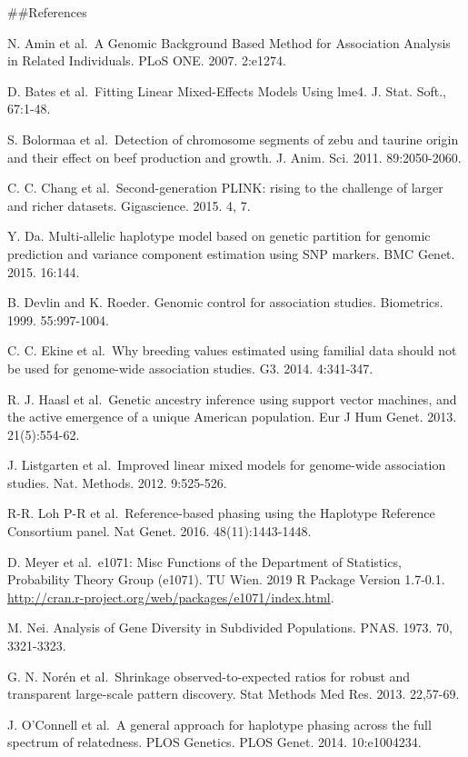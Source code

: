 \documentclass[
]{article}
\begin{document}
\pagebreak

\#\#References

N. Amin et al.~A Genomic Background Based Method for Association
Analysis in Related Individuals. PLoS ONE. 2007. 2:e1274.

D. Bates et al.~Fitting Linear Mixed-Effects Models Using lme4. J. Stat.
Soft., 67:1-48.

S. Bolormaa et al.~Detection of chromosome segments of zebu and taurine
origin and their effect on beef production and growth. J. Anim. Sci.
2011. 89:2050-2060.

C. C. Chang et al.~Second-generation PLINK: rising to the challenge of
larger and richer datasets. Gigascience. 2015. 4, 7.

Y. Da. Multi-allelic haplotype model based on genetic partition for
genomic prediction and variance component estimation using SNP markers.
BMC Genet. 2015. 16:144.

B. Devlin and K. Roeder. Genomic control for association studies.
Biometrics. 1999. 55:997-1004.

C. C. Ekine et al.~Why breeding values estimated using familial data
should not be used for genome-wide association studies. G3. 2014.
4:341-347.

R. J. Haasl et al.~Genetic ancestry inference using support vector
machines, and the active emergence of a unique American population. Eur
J Hum Genet. 2013. 21(5):554-62.

J. Listgarten et al.~Improved linear mixed models for genome-wide
association studies. Nat. Methods. 2012. 9:525-526.

R-R. Loh P-R et al.~Reference-based phasing using the Haplotype
Reference Consortium panel. Nat Genet. 2016. 48(11):1443-1448.

D. Meyer et al.~e1071: Misc Functions of the Department of Statistics,
Probability Theory Group (e1071). TU Wien. 2019 R Package Version
1.7-0.1. \url{http://cran.r-project.org/web/packages/e1071/index.html}.

M. Nei. Analysis of Gene Diversity in Subdivided Populations. PNAS.
1973. 70, 3321-3323.

G. N. Norén et al.~Shrinkage observed-to-expected ratios for robust and
transparent large-scale pattern discovery. Stat Methods Med Res. 2013.
22,57-69.

J. O'Connell et al.~A general approach for haplotype phasing across the
full spectrum of relatedness. PLOS Genetics. PLOS Genet. 2014.
10:e1004234.
\end{document}
